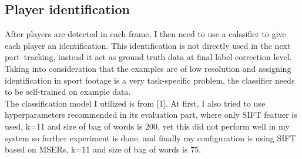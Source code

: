 \documentclass{article}
\begin{document}
\subsection{Player identification}
After players are detected in each frame, I then need to use a calssifier to give each player an identification. This identification is not directly used in the next part--tracking, instead it act as ground truth data at final label correction level.\\
Taking into consideration that the examples are of low resolution and assigning identification in sport footage is a very task-specific problem, the classifier needs to be self-trained on example data.\\ 
The classification model I utilized is from [1]. At first, I also tried to use hyperparameters recommended in its evaluation part, where only SIFT featuer is used, k=11 and size of bag of words is 200, yet this did not perform well in my system so further experiment is done, and finally my configuration is using SIFT based on MSERs, k=11 and size of bag of words is 75.
\end{document}
